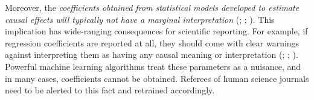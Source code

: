 \documentclass[
  single column]{article}
\begin{document}
Moreover, the \emph{coefficients obtained from statistical models
developed to estimate causal effects will typically not have a marginal
interpretation} (;
;
). This implication
has wide-ranging consequences for scientific reporting. For example, if
regression coefficients are reported at all, they should come with clear
warnings against interpreting them as having any causal meaning or
interpretation (;
;
). Powerful
machine learning algorithms treat these parameters as a nuisance, and in
many cases, coefficients cannot be obtained. Referees of human science
journals need to be alerted to this fact and retrained accordingly.
\end{document}
